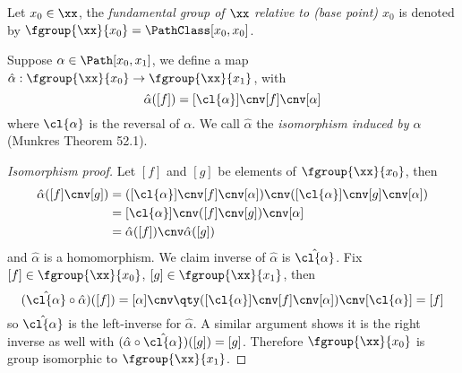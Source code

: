 \documentclass[../main-v2-manifolds.tex]{subfiles}
\begin{document}

\begin{definition}\label{munkres:fundamental-group}
    Let $x_0\in \xx$, the \emph{fundamental group of $\xx$ relative to (base point) $x_0$} is denoted by $\fgroup{\xx}{x_0}=\PathClass[x_0,x_0]$.
\end{definition}
\begin{definition}\label{munkres:path-isomorphism}
    Suppose $\alpha\in\Path[x_0,x_1]$, we define a map $\hat{\alpha}:\fgroup{\xx}{x_0}\to\fgroup{\xx}{x_1}$, with
    \[
        \hat{\alpha}([f]) = [\cl{\alpha}]\cnv[f]\cnv[\alpha]
    \]
    where $\cl{\alpha}$ is the reversal of $\alpha$. We call $\hat{\alpha}$ the \emph{isomorphism induced by $\alpha$} (Munkres Theorem 52.1).
\end{definition}

\begin{proof}[Isomorphism proof]\label{munkres:theorem52.1}
    Let $[f]$ and $[g]$ be elements of $\fgroup{\xx}{x_0}$, then 
    \begin{align*}
        \hat{\alpha}([f]\cnv[g]) &= ([\cl{\alpha}]\cnv[f]\cnv[\alpha])\cnv([\cl{\alpha}]\cnv[g]\cnv[\alpha])\\
        &= [\cl{\alpha}]\cnv([f]\cnv[g])\cnv[\alpha]\\
        &= \hat{\alpha}([f])\cnv\hat{\alpha}([g])
    \end{align*}
    and $\hat{\alpha}$ is a homomorphism. We claim inverse of $\hat{\alpha}$ is $\hat{\cl{\alpha}}$. Fix $[f]\in\fgroup{\xx}{x_0}$, $[g]\in\fgroup{\xx}{x_1}$, then
    \[
        (\hat{\cl{\alpha}}\circ\hat{\alpha})([f]) = [\alpha]\cnv\qty([\cl{\alpha}]\cnv[f]\cnv[\alpha])\cnv[\cl{\alpha}] = [f]
    \]
    so $\hat{\cl{\alpha}}$ is the left-inverse for $\hat{\alpha}$. A similar argument shows it is the right inverse as well with $(\hat{\alpha}\circ{\hat{\cl{\alpha}}})([g])=[g]$. Therefore $\fgroup{\xx}{x_0}$ is group isomorphic to $\fgroup{\xx}{x_1}$.
\end{proof}

\end{document}
